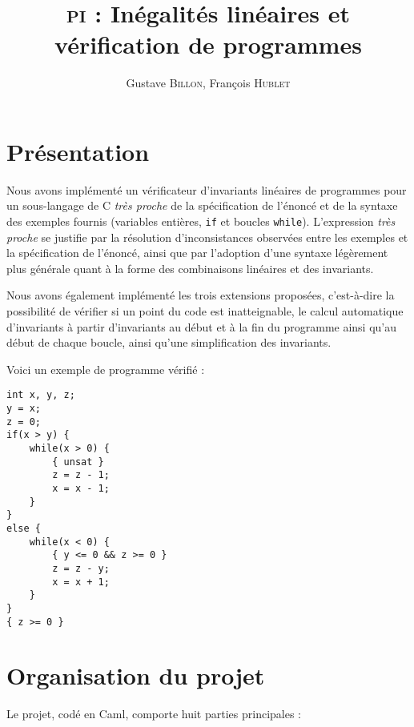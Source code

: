 \documentclass[a4paper]{article}
\title{\textsc{pi} : Inégalités linéaires et vérification de programmes}
\author{Gustave \textsc{Billon}, François \textsc{Hublet}}
\begin{document}
\maketitle


\section{Présentation}

Nous avons implémenté un vérificateur d'invariants linéaires de programmes pour un sous-langage de C \emph{très proche} de la spécification de l'énoncé et de la syntaxe des exemples fournis (variables entières, \texttt{if} et boucles \texttt{while}). L'expression \emph{très proche} se justifie par la résolution d'inconsistances observées entre les exemples et la spécification de l'énoncé, ainsi que par l'adoption d'une syntaxe légèrement plus générale quant à la forme des combinaisons linéaires et des invariants.

Nous avons également implémenté les trois extensions proposées, c'est-à-dire la possibilité de vérifier si un point du code est inatteignable, le calcul automatique d'invariants à partir d'invariants au début et à la fin du programme ainsi qu'au début de chaque boucle, ainsi qu'une simplification des invariants.

Voici un exemple de programme vérifié :

\begin{lstlisting}
int x, y, z;
y = x;
z = 0;
if(x > y) {
	while(x > 0) {
		{ unsat }
		z = z - 1;
		x = x - 1;
	}
}
else {
	while(x < 0) {
		{ y <= 0 && z >= 0 }
		z = z - y;
		x = x + 1;
	}
}
{ z >= 0 }
\end{lstlisting}

\section{Organisation du projet}

Le projet, codé en Caml, comporte huit parties principales :
\end{document}
